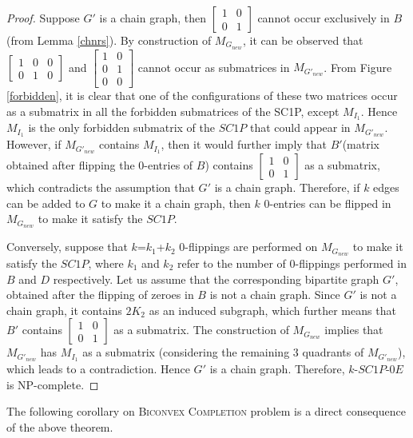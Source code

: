 \documentclass[review, 1p]{elsarticle}
\begin{document}
\begin{proof}
\indent Suppose $G'$ is a chain graph, then $\begin{bmatrix} 1 &0\\ 0 &1
\end{bmatrix}$ cannot occur exclusively in $B$ (from Lemma \ref{chnrs}). By construction of $M_{G_{new}}$, it can be observed that $\begin{bmatrix} 1 &0 &0\\ 0 &1 &0 \end{bmatrix} $ and $\begin{bmatrix} 1 &0\\ 0 &1\\ 0 &0 \end{bmatrix}$ cannot occur as submatrices in $M_{G'_{new}}$. From Figure \ref{forbidden}, it is clear that one of the configurations of these two matrices occur as a submatrix in all the forbidden submatrices of the SC1P, except $M_{I_{1}}$. Hence $M_{I_1}$ is the only forbidden submatrix of the $SC1P$ that could appear in $M_{G'_{new}}$. However, if $M_{G'_{new}}$ contains $M_{I_1}$, then it would further imply that $B'$(matrix obtained after flipping the 0-entries of $B$) contains $\begin{bmatrix} 1 &0\\ 0 &1 \end{bmatrix}$ as a submatrix, which contradicts the assumption that $G'$ is a chain graph. Therefore, if $k$ edges can be added to $G$ to make it a chain graph, then $k$ $0$-entries can be flipped in $M_{G_{new}}$ to make it satisfy the $SC1P$.

Conversely, suppose that $k$=$k_1$+$k_2$ $0$-flippings are performed on $M_{G_{new}}$ to make it satisfy the $SC1P$, where $k_1$ and $k_2$ refer to the number of $0$-flippings performed in $B$ and $D$ respectively. Let us assume that the corresponding bipartite graph $G'$, obtained after the flipping of zeroes in $B$ is not a chain graph. Since $G'$ is not a chain graph, it contains $2K_2$ as an induced subgraph, which further means that $B'$ contains $\begin{bmatrix}1 &0\\0 &1 \end{bmatrix} $ as a submatrix. The construction of $M_{G_{new}}$ implies that $M_{G'_{new}}$ has $M_{I_1}$ as a submatrix (considering the remaining $3$ quadrants of $M_{G'_{new}}$), which leads to a contradiction. Hence $G'$ is a chain graph. Therefore, $k$-$SC1P$-$0E$ is NP-complete.
\end{proof}
The following corollary on \textsc{Biconvex Completion} problem is a direct consequence of the above theorem.
\end{document}
